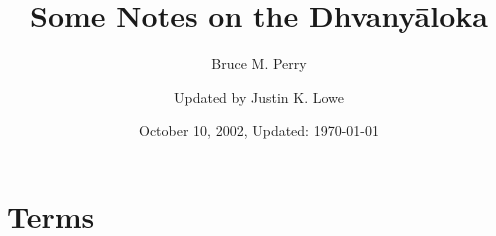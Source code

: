 \documentclass[12pt]{article}
\title{Some Notes on the Dhvanyāloka}
\author{Bruce M. Perry \and Updated by Justin K. Lowe}
\date{October 10, 2002, Updated: \today}
\begin{document}










\section{Terms}
\end{document}
